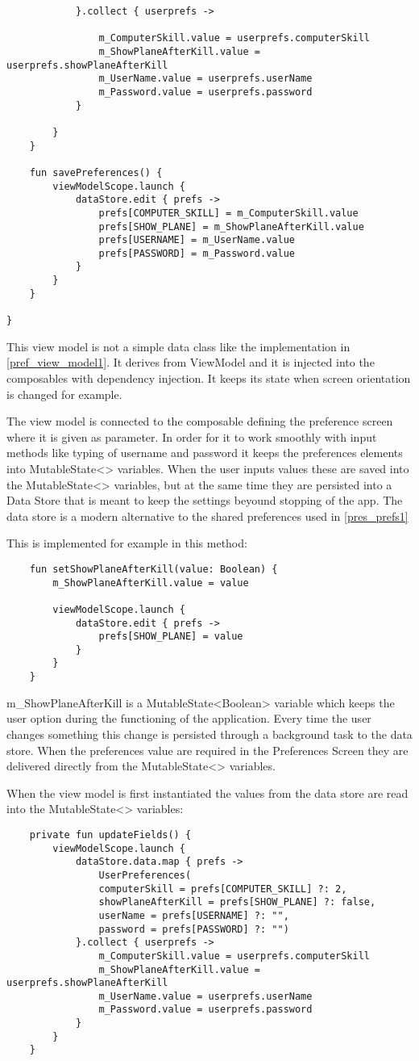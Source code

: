 \begin{lstlisting}
			}.collect { userprefs ->
				
				m_ComputerSkill.value = userprefs.computerSkill
				m_ShowPlaneAfterKill.value = userprefs.showPlaneAfterKill
				m_UserName.value = userprefs.userName
				m_Password.value = userprefs.password
			}
			
		}
	}
	
	fun savePreferences() {
		viewModelScope.launch {
			dataStore.edit { prefs ->
				prefs[COMPUTER_SKILL] = m_ComputerSkill.value
				prefs[SHOW_PLANE] = m_ShowPlaneAfterKill.value
				prefs[USERNAME] = m_UserName.value
				prefs[PASSWORD] = m_Password.value
			}
		}
	}
	
}
\end{lstlisting}

This view model is not a simple data class like the implementation in \ref{pref_view_model1}. It derives from ViewModel and it is injected into the composables with dependency injection. It keeps its state when screen orientation is changed for example. 

The view model is connected to the composable defining the preference screen where it is given as parameter. In order for it to work smoothly with input methods like typing of username and password it keeps the preferences elements into MutableState<> variables. When the user inputs values these are saved into the MutableState<> variables, but at the same time they are persisted into a Data Store that is meant to keep the settings beyound stopping of the app. The data store is a modern alternative to the shared preferences used in \ref{pres_prefs1}

This is implemented for example in this method:

\begin{lstlisting}
	fun setShowPlaneAfterKill(value: Boolean) {
		m_ShowPlaneAfterKill.value = value
		
		viewModelScope.launch {
			dataStore.edit { prefs ->
				prefs[SHOW_PLANE] = value
			}
		}
	}
\end{lstlisting}

m\_ShowPlaneAfterKill is a MutableState<Boolean> variable which keeps the user option during the functioning of the application. Every time the user changes something this change is persisted through a background task to the data store. When the preferences value are required in the Preferences Screen they are delivered directly from the MutableState<> variables.

When the view model is first instantiated the values from the data store are read into the MutableState<> variables:

\begin{lstlisting}
	private fun updateFields() {
		viewModelScope.launch {
			dataStore.data.map { prefs ->
				UserPreferences(
				computerSkill = prefs[COMPUTER_SKILL] ?: 2,
				showPlaneAfterKill = prefs[SHOW_PLANE] ?: false,
				userName = prefs[USERNAME] ?: "",
				password = prefs[PASSWORD] ?: "")
			}.collect { userprefs ->
				m_ComputerSkill.value = userprefs.computerSkill
				m_ShowPlaneAfterKill.value = userprefs.showPlaneAfterKill
				m_UserName.value = userprefs.userName
				m_Password.value = userprefs.password
			}	
		}
	}
\end{lstlisting}